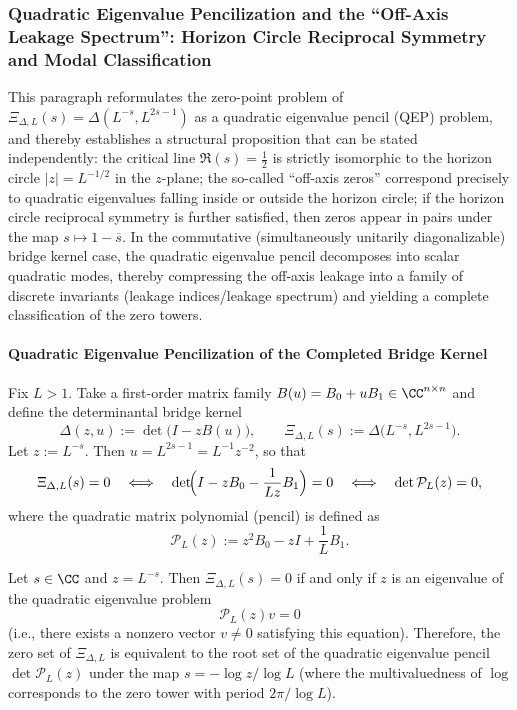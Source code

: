 \subsubsection{Quadratic Eigenvalue Pencilization and the ``Off-Axis Leakage Spectrum'': Horizon Circle Reciprocal Symmetry and Modal Classification}\label{subsubsec:xi-quadratic-pencil-leakage-spectrum}
This paragraph reformulates the zero-point problem of \(\Xi_{\Delta,L}(s)=\Delta(L^{-s},L^{2s-1})\) as a quadratic eigenvalue pencil (QEP) problem, and thereby establishes a structural proposition that can be stated independently: the critical line \(\Re(s)=\tfrac12\) is strictly isomorphic to the horizon circle \(|z|=L^{-1/2}\) in the \(z\)-plane; the so-called ``off-axis zeros'' correspond precisely to quadratic eigenvalues falling inside or outside the horizon circle; if the horizon circle reciprocal symmetry is further satisfied, then zeros appear in pairs under the map \(s\mapsto 1-\overline{s}\).
In the commutative (simultaneously unitarily diagonalizable) bridge kernel case, the quadratic eigenvalue pencil decomposes into scalar quadratic modes, thereby compressing the off-axis leakage into a family of discrete invariants (leakage indices/leakage spectrum) and yielding a complete classification of the zero towers.

\paragraph{Quadratic Eigenvalue Pencilization of the Completed Bridge Kernel}
Fix \(L>1\).
Take a first-order matrix family \(B(u)=B_0+uB_1\in\CC^{n\times n}\) and define the determinantal bridge kernel
\[
\Delta(z,u):=\det\!\bigl(I-zB(u)\bigr),
\qquad
\Xi_{\Delta,L}(s):=\Delta\!\bigl(L^{-s},L^{2s-1}\bigr).
\]
Let \(z:=L^{-s}\). Then \(u=L^{2s-1}=L^{-1}z^{-2}\), so that
\begin{equation}\label{eq:xi-qep-determinant-rewrite}
\Xi_{\Delta,L}(s)=0
\quad\Longleftrightarrow\quad
\det\!\Bigl(I-zB_0-\frac{1}{Lz}B_1\Bigr)=0
\quad\Longleftrightarrow\quad
\det \mathcal{P}_L(z)=0,
\end{equation}
where the quadratic matrix polynomial (pencil) is defined as
\begin{equation}\label{eq:xi-qep-PL-def}
\mathcal{P}_L(z):=z^2B_0-zI+\frac1L B_1.
\end{equation}

\begin{theorem}\label{thm:xi-qep-zero-equivalence}
Let \(s\in\CC\) and \(z=L^{-s}\).
Then \(\Xi_{\Delta,L}(s)=0\) if and only if \(z\) is an eigenvalue of the quadratic eigenvalue problem
\[
\mathcal{P}_L(z)v=0
\]
(i.e., there exists a nonzero vector \(v\neq 0\) satisfying this equation).
Therefore, the zero set of \(\Xi_{\Delta,L}\) is equivalent to the root set of the quadratic eigenvalue pencil \(\det \mathcal{P}_L(z)\) under the map \(s=-\log z/\log L\) (where the multivaluedness of \(\log\) corresponds to the zero tower with period \(2\pi/\log L\)).
\end{theorem}

